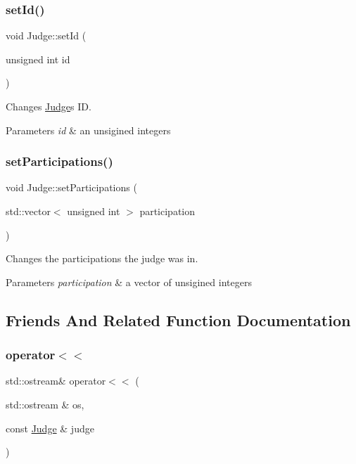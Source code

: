 \subsubsection{\texorpdfstring{set\+Id()}{setId()}}
{\footnotesize\ttfamily void Judge\+::set\+Id (\begin{DoxyParamCaption}\item[{unsigned int}]{id }\end{DoxyParamCaption})}



Changes \hyperlink{class_judge}{Judge}\textquotesingle{}s ID. 


\begin{DoxyParams}{Parameters}
{\em id} & an unsigined integers \\
\hline
\end{DoxyParams}
\mbox{\label{class_judge_ab6bf287475108075c5c95f3fa0d7e6b0}} 
\subsubsection{\texorpdfstring{set\+Participations()}{setParticipations()}}
{\footnotesize\ttfamily void Judge\+::set\+Participations (\begin{DoxyParamCaption}\item[{std\+::vector$<$ unsigned int $>$}]{participation }\end{DoxyParamCaption})}



Changes the participations the judge was in. 


\begin{DoxyParams}{Parameters}
{\em participation} & a vector of unsigined integers \\
\hline
\end{DoxyParams}


\subsection{Friends And Related Function Documentation}
\mbox{\label{class_judge_ad83f9941c7a7e0ae112d4fcf186f86cb}} 
\subsubsection{\texorpdfstring{operator$<$$<$}{operator<<}}
{\footnotesize\ttfamily std\+::ostream\& operator$<$$<$ (\begin{DoxyParamCaption}\item[{std\+::ostream \&}]{os,  }\item[{const \hyperlink{class_judge}{Judge} \&}]{judge }\end{DoxyParamCaption})\hspace{0.3cm}{\ttfamily [friend]}}

